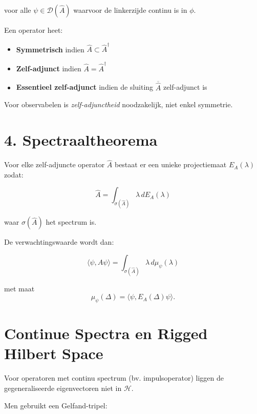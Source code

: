 \documentclass{report} %
\begin{document}
    voor alle $\psi \in \mathcal{D}(\hat{A})$ waarvoor
    de linkerzijde continu is in $\phi$.

    Een operator heet:

    \begin{itemize}
        \item \textbf{Symmetrisch} indien
        $\hat{A} \subset \hat{A}^\dagger$
        \item \textbf{Zelf-adjunct} indien
        $\hat{A} = \hat{A}^\dagger$
        \item \textbf{Essentieel zelf-adjunct} indien de sluiting
        $\overline{\hat{A}}$ zelf-adjunct is
    \end{itemize}

    Voor observabelen is \emph{zelf-adjunctheid} noodzakelijk,
    niet enkel symmetrie.


    \section*{4. Spectraaltheorema}

    Voor elke zelf-adjuncte operator $\hat{A}$ bestaat er een unieke
    projectiemaat $E_A(\lambda)$ zodat:

    \begin{equation}
        \hat{A} =
        \int_{\sigma(\hat{A})}
        \lambda \, dE_A(\lambda)
    \end{equation}

    waar $\sigma(\hat{A})$ het spectrum is.

    De verwachtingswaarde wordt dan:

    \begin{equation}
        \langle \psi, \hat{A}\psi \rangle
        =
        \int_{\sigma(\hat{A})}
        \lambda \,
        d\mu_\psi(\lambda)
    \end{equation}

    met maat
    \[
        \mu_\psi(\Delta)
        =
        \langle \psi, E_A(\Delta)\psi\rangle.
    \]


    \section{Continue Spectra en Rigged Hilbert Space}

    Voor operatoren met continu spectrum (bv. impulsoperator)
    liggen de gegeneraliseerde eigenvectoren niet in $\mathcal{H}$.

    Men gebruikt een Gelfand-tripel:
\end{document}
